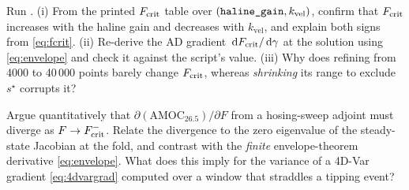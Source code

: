 \begin{exercise}
Run . (i) From the
printed $F_{\mathrm{crit}}$ table over $(\texttt{haline\_gain},k_{\mathrm{vel}})$, confirm that
$F_{\mathrm{crit}}$ increases with the haline gain and decreases with $k_{\mathrm{vel}}$, and
explain both signs from \eqref{eq:fcrit}. (ii) Re-derive the AD gradient
$\,\mathrm{d}F_{\mathrm{crit}}/\,\mathrm{d}\gamma$ at the solution using \eqref{eq:envelope} and check it
against the script's value. (iii) Why does refining  from 4000 to
40\,000 points barely change $F_{\mathrm{crit}}$, whereas \emph{shrinking} its range to
exclude $s^\star$ corrupts it?
\end{exercise}

\begin{exercise}
Argue quantitatively that $\partial(\text{AMOC}_{26.5})/\partial F$ from a
hosing-sweep adjoint must diverge as $F\to F_{\mathrm{crit}}^-$. Relate the divergence to the
zero eigenvalue of the steady-state Jacobian at the fold, and contrast with the
\emph{finite} envelope-theorem derivative \eqref{eq:envelope}. What does this
imply for the variance of a 4D-Var gradient \eqref{eq:4dvargrad} computed over a
window that straddles a tipping event?
\end{exercise}

